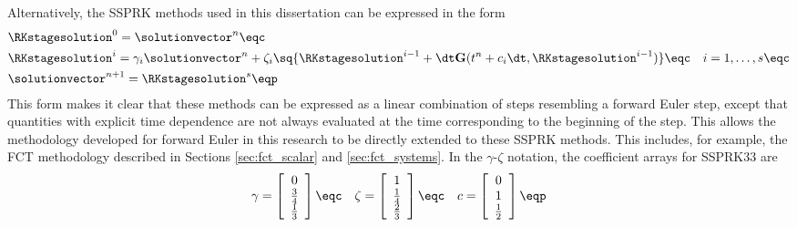 Alternatively, the SSPRK methods used in this dissertation can be expressed
in the form
\begin{subequations}
\begin{align}
  & \RKstagesolution^0 = \solutionvector^n \eqc \\
  & \RKstagesolution^i = \gamma_i \solutionvector^n + \zeta_i \sq{
      \RKstagesolution^{i-1}
      + \dt\mathbf{G}(t^n+c_i\dt, \RKstagesolution^{i-1})}
    \eqc \quad
    i = 1,\ldots,s
    \eqc \\
  & \solutionvector^{n+1} = \RKstagesolution^s \eqp
\end{align}
\end{subequations}
This form makes it clear that these methods can be expressed as a linear
combination of steps resembling a forward Euler step, except that quantities
with explicit time dependence are not always evaluated at the time
corresponding to the beginning of the step. This allows the methodology
developed for forward Euler in this research to be directly extended to these
SSPRK methods.  This includes, for example, the FCT methodology described in
Sections \ref{sec:fct_scalar} and \ref{sec:fct_systems}.
In the $\gamma$-$\zeta$ notation, the coefficient arrays for SSPRK33 are
\begin{equation}
  \gamma = \left[\begin{array}{c}
    0\\\frac{3}{4}\\\frac{1}{3}\end{array}\right]
  \eqc \quad
  \zeta = \left[\begin{array}{c}
    1\\\frac{1}{4}\\\frac{2}{3}\end{array}\right]
  \eqc \quad
  c = \left[\begin{array}{c}0\\1\\\frac{1}{2}\end{array}\right] \eqp
\end{equation}
